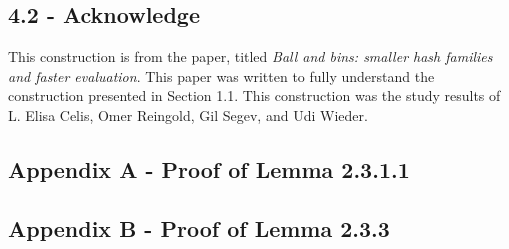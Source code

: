 \documentclass[a4paper, english]{paper}
\begin{document}
	 \subsection{4.2 - Acknowledge} 
\quad	 This construction is from the paper, titled \textit{Ball and bins: smaller hash families and faster evaluation}. This paper was written to fully understand the construction presented in Section 1.1. This construction was the study results of L. Elisa Celis, Omer Reingold, Gil Segev, and Udi Wieder. 	
	 
	\subsection{Appendix A - Proof of Lemma 2.3.1.1}

	\subsection{Appendix B - Proof of Lemma 2.3.3} 
	\newpage
\end{document}
